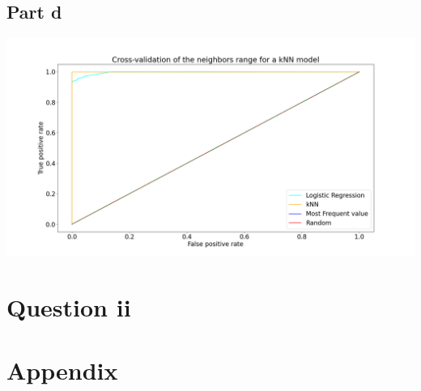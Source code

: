 \documentclass[10pt]{article}
\begin{document}
\subsection*{Part d}

\begin{center}
    \includegraphics[scale=0.25]{roc.png}
\end{center}
\vspace{5mm} %

\section*{Question ii}

\section*{Appendix}
\begin{lstlisting}[language=Python]    
\end{lstlisting}
\end{document}
